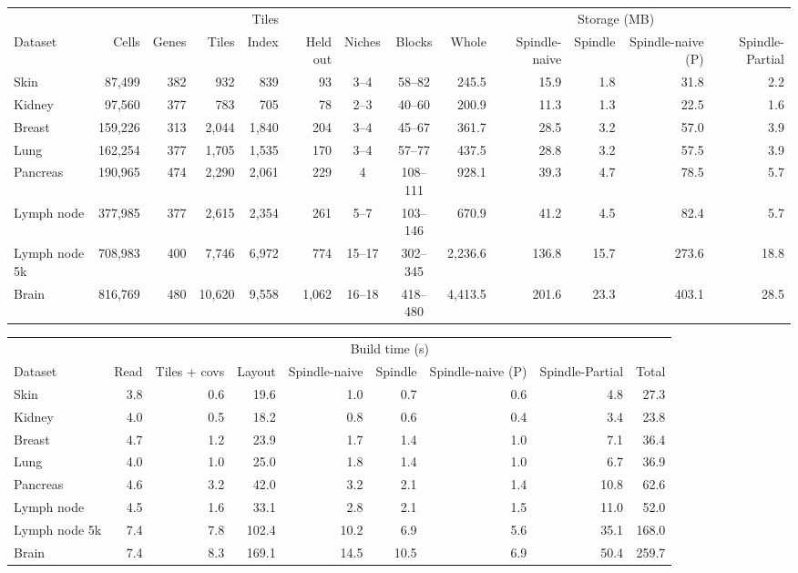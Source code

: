 \begin{tabular}{lrrrrrccrrrrr}
\toprule
 &  &  & \multicolumn{3}{c}{Tiles} &  &  & \multicolumn{5}{c}{Storage (MB)} \\
\cmidrule(lr){4-6} \cmidrule(lr){9-13}
Dataset & Cells & Genes & Tiles & Index & Held out & Niches & Blocks & Whole & Spindle-naive & Spindle & Spindle-naive (P) & Spindle-Partial \\
\midrule
Skin & 87{,}499 & 382 & 932 & 839 & 93 & 3--4 & 58--82 & 245.5 & 15.9 & 1.8 & 31.8 & 2.2 \\
Kidney & 97{,}560 & 377 & 783 & 705 & 78 & 2--3 & 40--60 & 200.9 & 11.3 & 1.3 & 22.5 & 1.6 \\
Breast & 159{,}226 & 313 & 2{,}044 & 1{,}840 & 204 & 3--4 & 45--67 & 361.7 & 28.5 & 3.2 & 57.0 & 3.9 \\
Lung & 162{,}254 & 377 & 1{,}705 & 1{,}535 & 170 & 3--4 & 57--77 & 437.5 & 28.8 & 3.2 & 57.5 & 3.9 \\
Pancreas & 190{,}965 & 474 & 2{,}290 & 2{,}061 & 229 & 4 & 108--111 & 928.1 & 39.3 & 4.7 & 78.5 & 5.7 \\
Lymph node & 377{,}985 & 377 & 2{,}615 & 2{,}354 & 261 & 5--7 & 103--146 & 670.9 & 41.2 & 4.5 & 82.4 & 5.7 \\
Lymph node 5k & 708{,}983 & 400 & 7{,}746 & 6{,}972 & 774 & 15--17 & 302--345 & 2{,}236.6 & 136.8 & 15.7 & 273.6 & 18.8 \\
Brain & 816{,}769 & 480 & 10{,}620 & 9{,}558 & 1{,}062 & 16--18 & 418--480 & 4{,}413.5 & 201.6 & 23.3 & 403.1 & 28.5 \\
\bottomrule
\end{tabular}

\medskip

\begin{tabular}{lrrrrrrrr}
\toprule
 & \multicolumn{8}{c}{Build time (s)} \\
\cmidrule(lr){2-9}
Dataset & Read & Tiles + covs & Layout & Spindle-naive & Spindle & Spindle-naive (P) & Spindle-Partial & Total \\
\midrule
Skin & 3.8 & 0.6 & 19.6 & 1.0 & 0.7 & 0.6 & 4.8 & 27.3 \\
Kidney & 4.0 & 0.5 & 18.2 & 0.8 & 0.6 & 0.4 & 3.4 & 23.8 \\
Breast & 4.7 & 1.2 & 23.9 & 1.7 & 1.4 & 1.0 & 7.1 & 36.4 \\
Lung & 4.0 & 1.0 & 25.0 & 1.8 & 1.4 & 1.0 & 6.7 & 36.9 \\
Pancreas & 4.6 & 3.2 & 42.0 & 3.2 & 2.1 & 1.4 & 10.8 & 62.6 \\
Lymph node & 4.5 & 1.6 & 33.1 & 2.8 & 2.1 & 1.5 & 11.0 & 52.0 \\
Lymph node 5k & 7.4 & 7.8 & 102.4 & 10.2 & 6.9 & 5.6 & 35.1 & 168.0 \\
Brain & 7.4 & 8.3 & 169.1 & 14.5 & 10.5 & 6.9 & 50.4 & 259.7 \\
\bottomrule
\end{tabular}
